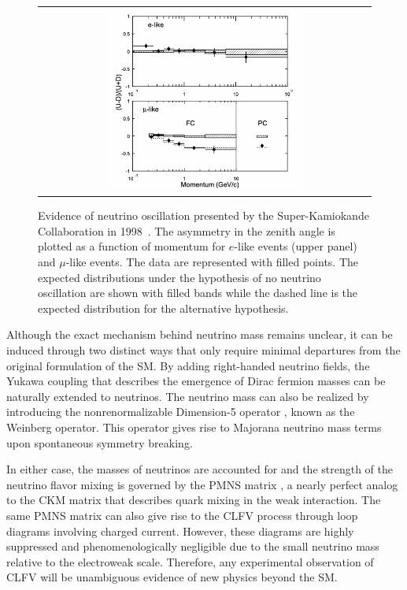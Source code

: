 \begin{figure}[tbh!]
 \begin{center}
 \begin{tabular}{c}
 \includegraphics[width=0.6\textwidth]{figures/Part1/BSM/SuperK}
 \end{tabular}
 \caption{Evidence of neutrino oscillation presented by the Super-Kamiokande Collaboration in 1998~\cite{Super-Kamiokande:1998kpq}. The asymmetry in the zenith angle is plotted as a function of momentum for $e$-like events (upper panel) and $\mu$-like events. The data are represented with filled points. The expected distributions under the hypothesis of no neutrino oscillation are shown with filled bands while the dashed line is the expected distribution for the alternative hypothesis.}
 \label{fig:SuperK}
 \end{center}
\end{figure}

Although the exact mechanism behind neutrino mass remains unclear, it can be induced through two distinct ways that only require minimal departures from the original formulation of the \ac{SM}. By adding right-handed neutrino fields, the Yukawa coupling \cite{Weinberg:1967tq} that describes the emergence of Dirac fermion masses can be naturally extended to neutrinos. The neutrino mass can also be realized by introducing the nonrenormalizable Dimension-5 operator \cite{Weinberg:1979sa}, known as the Weinberg operator. This operator gives rise to Majorana neutrino mass terms upon spontaneous symmetry breaking. 

In either case, the masses of neutrinos are accounted for and the strength of the neutrino flavor mixing is governed by the \ac{PMNS} matrix \cite{Pontecorvo:1957cp,Maki:1962mu}, a nearly perfect analog to the \ac{CKM} matrix \cite{Cabibbo:1963yz,Kobayashi:1973fv} that describes quark mixing in the weak interaction. The same \ac{PMNS} matrix can also give rise to the \ac{CLFV} process through loop diagrams involving charged current. However, these diagrams are highly suppressed and phenomenologically negligible due to the small neutrino mass relative to the electroweak scale. Therefore, any experimental observation of \ac{CLFV} will be unambiguous evidence of new physics beyond the \ac{SM}.

